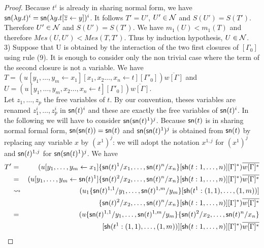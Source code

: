 \documentclass{llncs} %
\newif\ifnonotes\nonotesfalse
\newcommand{\EMPTY}[1]{\ifnonotes\else{\color{red}    \noindent #1}\fi}
\begin{document}
\begin{proof}
%
Because $t^i$ is already in sharing normal form, we have  ${\mathsf{sn}}(\lambda y.t)^i = {\mathsf{sn}}(\lambda y.t[\overline{z}\leftarrow  y])^i$.  
It follows $T' = U'$, $U'\in\mathcal{N}$ and $S(U') = S(T')$.
\\
Therefore $U'\in\mathcal{N}$ and $S(U') = S(T')$. We  have  $m_1(U) < m_1(T)$ and therefore  $Mes(U,U') < Mes(T,T')$. Thus by induction hypothesis, $U\in\mathcal{N}$.
%
%
%
%
\medskip
\\
3)  Suppose that U is obtained by the interaction of the two first closures of $[\Gamma_0]$ using rule (9). It is enough to consider only the non trivial case where the term of the second closure is not a variable. We have \\
$T = (u[y_1,\dots,y_m  \leftarrow x_1][x_1,x_2\dots,x_n \leftarrow t][\Gamma'_0])\overline{w[\Gamma]}$   and 
\\
$U = (u[y_1,\dots,y_m,x_2\dots,x_n \leftarrow t][\Gamma'_0])\overline{w[\Gamma]}$.
\\
Let $z_1,\dots,z_p$ the free variables of $t$. By our convention, theses variables are renamed $z_1^i,\dots,z_p^i$ in ${\mathsf{sn}}(t)^i$ and these are exactly the free variables of  ${\mathsf{sn}}(t)^i$. In the following we will have to consider ${\mathsf{sn}} ({\mathsf{sn}} (t)^1)^j$. Because ${\mathsf{sn}}(t)$ is in sharing normal formal form, ${\mathsf{sn}}({\mathsf{sn}}(t)) = {\mathsf{sn}}(t)$ and ${\mathsf{sn}} ({\mathsf{sn}} (t)^1)^j$ is obtained from ${\mathsf{sn}}(t)$ by replacing any variable $x$ by $(x^1)^j$: we will  adopt the notation $x^{1,j}$ for $(x^1)^j$ and ${\mathsf{sn}}(t)^{1,j}$ for ${\mathsf{sn}} ({\mathsf{sn}} (t)^1)^j$.
%
We have 
%
\begin{eqnarray*}
 T' & = & (u[y_1,\dots,y_m \leftarrow x_1]\{\sn(t)^1/x_1,\dots,\sn(t)^n/x_n\}[\sh (t:1,\dots,n)][\Gamma]^*)\overline{w[\Gamma]^*} \\
    & = & (u[y_1,\dots,y_m \leftarrow \sn(t)^1]\{\sn(t)^2/x_2,\dots,\sn(t)^n/x_n\}[\sh (t:1,\dots,n)][\Gamma]^*)\overline{w[\Gamma]^*} \\
    & \rightsquigarrow & (u_1\{\sn(t)^{1,1}/y_1,\dots,\sn(t)^{1,m}/y_m\}[\sh (t^1:(1,1),\dots,(1,m))] \\
    &   & \{\sn(t)^2/x_2,\dots,\sn(t)^n/x_n\}[\sh (t:1,\dots,n)][\Gamma]^*)\overline{w[\Gamma]^*} \\
    & = & (u\{\sn(t)^{1,1}/y_1,\dots,\sn(t)^{1,m}/y_m\}\{\sn(t)^2/x_2,\dots,\sn(t)^n/x_n\} \\
    &   & [\sh (t^1:(1,1),\dots,(1,m))][\sh (t:1,\dots,n)][\Gamma]^*)\overline{w[\Gamma]^*}   \\

\end{eqnarray*}
\end{proof}
\end{document}
